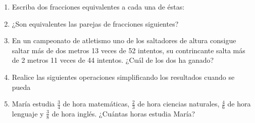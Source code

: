\documentclass[10pt,twoside]{article}
\begin{document}
\begin{enumerate}
\begin{enumerate}
\end{enumerate}
\item Escriba dos fracciones equivalentes a cada una de éstas:
\begin{enumerate}
\end{enumerate}
\item ¿Son equivalentes las parejas de fracciones siguientes?
\begin{enumerate}
\end{enumerate}
\item En un campeonato de atletismo uno de los saltadores de altura consigue saltar más de dos metros 13 veces de 52 intentos, su contrincante salta m\'{a}s de 2 metros 11 veces de 44 intentos. ¿Cu\'{a}l de los dos ha ganado?
\item Realice las siguientes operaciones simplificando los resultados cuando se pueda
\begin{enumerate}
\end{enumerate}
\item María estudia $\frac{3}{4}$ de hora matemáticas, $\frac{2}{3}$ de hora ciencias naturales, $\frac{4}{6}$ de hora lenguaje y $\frac{3}{8}$ de hora inglés. ¿Cuántas horas estudia María?

\end{enumerate}
\end{document}
